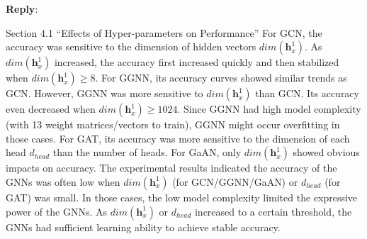 \documentclass[12pt]{article}
\newcommand{\MyVec}[1]{\boldsymbol{#1}}
\newenvironment{myquote}[1]%
{\vspace{0.5em}\begin{zitat}{#1}}
{\end{zitat}\vspace{0.5em}}
\newenvironment{reply}
   {\medskip \noindent \textbf{Reply}:\  }
   {\medskip}
\begin{document}
\begin{reply}
\begin{myquote}{Section 4.1 ``Effects of Hyper-parameters on Performance''}
    For GCN, the accuracy was sensitive to the dimension of hidden vectors $dim(\MyVec{h}^1_x)$.
    As $dim(\MyVec{h}^1_x)$ increased, the accuracy first increased quickly and then stabilized when $dim(\MyVec{h}_x^1) \geq 8$.
    For GGNN, its accuracy curves showed similar trends as GCN.
    However, GGNN was more sensitive to $dim(\MyVec{h}_x^1)$ than GCN.
    Its accuracy even decreased when $dim(\MyVec{h}_x^1) \geq 1024$.
    Since GGNN had high model complexity (with 13 weight matrices/vectors to train), GGNN might occur overfitting in those cases.
    For GAT, its accuracy was more sensitive to the dimension of each head $d_{head}$ than the number of heads.
    For GaAN, only $dim(\MyVec{h}_x^1)$ showed obvious impacts on accuracy.
    The experimental results indicated the accuracy of the GNNs was often low when $dim(\MyVec{h}_x^1)$ (for GCN/GGNN/GaAN) or $d_{head}$ (for GAT) was small.
    In those cases, the low model complexity limited the expressive power of the GNNs.
    As $dim(\MyVec{h}_x^1)$ or $d_{head}$ increased to a certain threshold, the GNNs had sufficient learning ability to achieve stable accuracy.
    

\end{myquote}
\end{reply}
\end{document}
